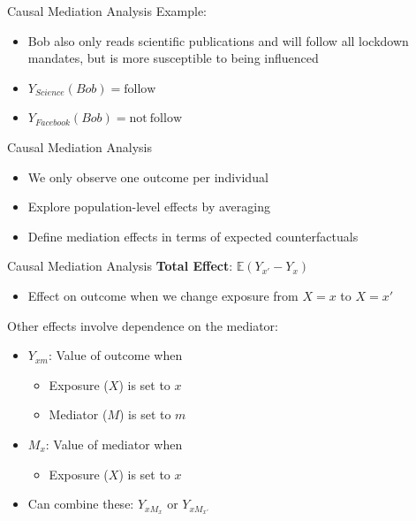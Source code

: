 \documentclass[14pt]{beamer}
\begin{document}
\begin{frame}{Causal Mediation Analysis}
    Example:
    \begin{itemize}
        \item Bob also only reads scientific publications and will follow all lockdown mandates, but is more susceptible to being influenced \newline
        \item $Y_{Science}(Bob) = \mathrm{follow}$
        \item $Y_{Facebook}(Bob) = \mathrm{not\ follow}$
    \end{itemize}
\end{frame}

\begin{frame}{Causal Mediation Analysis}
    \begin{itemize}
        \item We only observe one outcome per individual\newline

        \item Explore population-level effects by averaging\newline

        \item Define mediation effects in terms of expected counterfactuals
    \end{itemize}
\end{frame}

\begin{frame}{Causal Mediation Analysis}
    \textbf{Total Effect}: $\mathbb{E}(Y_{x'} - Y_{x})$
    \begin{itemize}
        \item Effect on outcome when we change exposure from $X=x$ to $X=x'$ \newline
    \end{itemize}

    Other effects involve dependence on the mediator:
    \begin{itemize}
        \item $Y_{xm}$: Value of outcome when
        \begin{itemize}
            \item Exposure ($X$) is set to $x$
            \item Mediator ($M$) is set to $m$
        \end{itemize}
        \item $M_x$: Value of mediator when
        \begin{itemize}
            \item Exposure ($X$) is set to $x$
        \end{itemize}
        \item Can combine these: $Y_{x M_x}$ or $Y_{x M_{x'}}$
    \end{itemize}

\end{frame}
\end{document}
